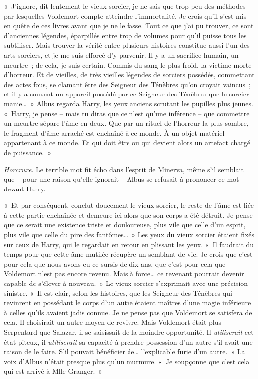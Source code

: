«~J'ignore, dit lentement le vieux sorcier, je ne sais que trop peu des méthodes par lesquelles Voldemort compte atteindre l'immortalité. Je crois qu'il s'est mis en quête de ces livres avant que je ne le fasse. Tout ce que j'ai pu trouver, ce sont d'anciennes légendes, éparpillés entre trop de volumes pour qu'il puisse tous les subtiliser. Mais trouver la vérité entre plusieurs histoires constitue aussi l'un des arts sorciers, et je me suis efforcé d'y parvenir. Il y a un sacrifice humain, un meurtre~; de cela, je suis certain. Commis du sang le plus froid, la victime morte d'horreur. Et de vieilles, de très vieilles légendes de sorciers possédés, commettant des actes fous, se clamant être des Seigneur des Ténèbres qu'on croyait vaincus~; et il y a souvent un appareil possédé par ce Seigneur des Ténèbres que le sorcier manie…~» Albus regarda Harry, les yeux anciens scrutant les pupilles plus jeunes. «~Harry, je pense -- mais tu diras que ce n'est qu'une inférence -- que commettre un meurtre sépare l'âme en deux. Que par un rituel de l'horreur la plus sombre, le fragment d'âme arraché est enchaîné à ce monde. À un objet matériel appartenant à ce monde. Et qui doit être ou qui devient alors un artefact chargé de puissance.~»

\emph{Horcruxe}. Le terrible mot fit écho dans l'esprit de Minerva, même s'il semblait que -- pour une raison qu'elle ignorait -- Albus se refusait à prononcer ce mot devant Harry.

«~Et par conséquent, conclut doucement le vieux sorcier, le reste de l'âme est liée à cette partie enchaînée et demeure ici alors que son corps a été détruit. Je pense que ce serait une existence triste et douloureuse, plus vile que celle d'un esprit, plus vile que celle du pire des fantômes…~» Les yeux du vieux sorcier étaient fixés sur ceux de Harry, qui le regardait en retour en plissant les yeux. «~Il faudrait du temps pour que cette âme mutilée récupère un semblant de vie. Je crois que c'est pour cela que nous avons eu ce sursis de dix ans, que c'est pour cela que Voldemort n'est pas encore revenu. Mais à force… ce revenant pourrait devenir capable de s'élever à nouveau.~» Le vieux sorcier s'exprimait avec une précision sinistre. «~Il est clair, selon les histoires, que les Seigneur des Ténèbres qui revinrent en possédant le corps d'un autre étaient maîtres d'une magie inférieure à celles qu'ils avaient jadis connue. Je ne pense pas que Voldemort se satisfera de cela. Il choisirait un autre moyen de revivre. Mais Voldemort était plus Serpentard que Salazar, il se saisissait de la moindre opportunité. Il \emph{utiliserait} cet état piteux, il \emph{utiliserait} sa capacité à prendre possession d'un autre s'il avait une raison de le faire. S'il pouvait bénéficier de… l'explicable furie d'un autre.~» La voix d'Albus n'était presque plus qu'un murmure. «~Je soupçonne que c'est cela qui est arrivé à Mlle Granger.~»

